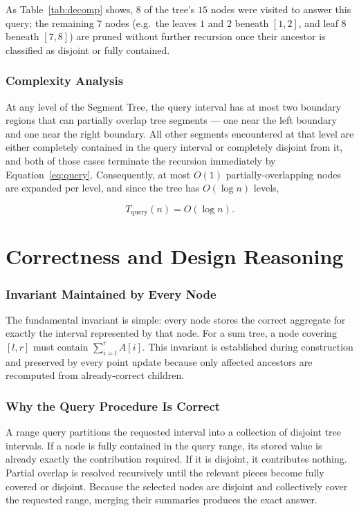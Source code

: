 \documentclass[11pt,open=any]{scrreprt}
\begin{document}
As Table~\ref{tab:decomp} shows, $8$ of the tree's $15$ nodes were visited to answer this query; the remaining $7$ nodes (e.g.\ the leaves $1$ and $2$ beneath $[1,2]$, and leaf $8$ beneath $[7,8]$) are pruned without further recursion once their ancestor is classified as disjoint or fully contained.

\subsection{Complexity Analysis}
\label{sec:overlap-argument}
At any level of the Segment Tree, the query interval has at most two boundary regions that can partially overlap tree segments --- one near the left boundary and one near the right boundary. All other segments encountered at that level are either completely contained in the query interval or completely disjoint from it, and both of those cases terminate the recursion immediately by Equation~\eqref{eq:query}. Consequently, at most $O(1)$ partially-overlapping nodes are expanded per level, and since the tree has $O(\log n)$ levels,

\begin{equation}
\boxed{T_{\text{query}}(n) = O(\log n)}.
\end{equation}

\chapter{Correctness and Design Reasoning}

\subsection{Invariant Maintained by Every Node}
The fundamental invariant is simple: every node stores the correct aggregate for exactly the interval represented by that node. For a sum tree, a node covering $[l,r]$ must contain $\sum_{i=l}^{r}A[i]$. This invariant is established during construction and preserved by every point update because only affected ancestors are recomputed from already-correct children.

\subsection{Why the Query Procedure Is Correct}
A range query partitions the requested interval into a collection of disjoint tree intervals. If a node is fully contained in the query range, its stored value is already exactly the contribution required. If it is disjoint, it contributes nothing. Partial overlap is resolved recursively until the relevant pieces become fully covered or disjoint. Because the selected nodes are disjoint and collectively cover the requested range, merging their summaries produces the exact answer.
\end{document}
